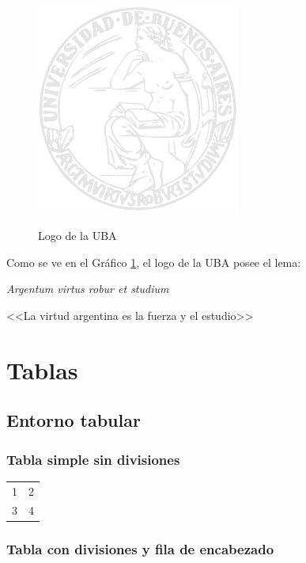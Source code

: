 \documentclass{article}
\begin{document}
\begin{figure}[h]
  \centering
  \caption{Logo de la UBA}
  \includegraphics[width=0.6\textwidth]{logo_uba}
  \label{fig:logo_uba}
\end{figure}

Como se ve en el Gráfico \ref{fig:logo_uba}, el logo de la UBA posee el lema:

\begin{center}
  \textit{Argentum virtus robur et studium}

  <<La virtud argentina es la fuerza y el estudio>>
\end{center}

\section{Tablas}

\subsection{Entorno tabular}

\subsubsection{Tabla simple sin divisiones}

\begin{tabular}{c c}
1 & 2 \\
3 & 4 \\
\end{tabular}

\subsubsection{Tabla con divisiones y fila de encabezado}
\end{document}
